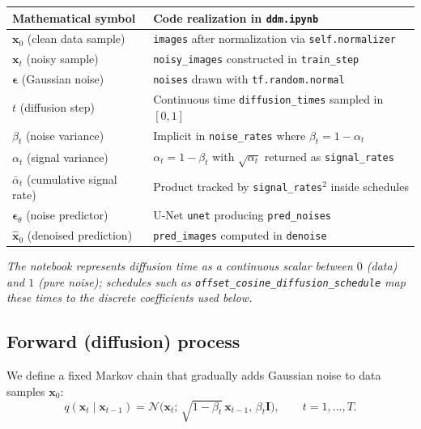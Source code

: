 \documentclass[11pt]{article}
\theoremstyle{remark}
\begin{document}
\begin{center}
\renewcommand{\arraystretch}{1.2}
\begin{tabularx}{\textwidth}{@{}>{\raggedright\arraybackslash}p{} >{\raggedright\arraybackslash}X@{}}
\toprule
\textbf{Mathematical symbol} & \textbf{Code realization in \texttt{ddm.ipynb}} \\
\midrule
$\mathbf{x}_0$ (clean data sample) & \texttt{images} after normalization via \texttt{self.normalizer} \\
$\mathbf{x}_t$ (noisy sample) & \texttt{noisy\_images} constructed in \texttt{train\_step} \\
$\boldsymbol{\epsilon}$ (Gaussian noise) & \texttt{noises} drawn with \texttt{tf.random.normal} \\
$t$ (diffusion step) & Continuous time \texttt{diffusion\_times} sampled in $[0,1]$ \\
$\beta_t$ (noise variance) & Implicit in \texttt{noise\_rates} where $\beta_t = 1 - \alpha_t$ \\
$\alpha_t$ (signal variance) & $\alpha_t = 1 - \beta_t$ with $\sqrt{\alpha_t}$ returned as \texttt{signal\_rates} \\
$\bar{\alpha}_t$ (cumulative signal rate) & Product tracked by \texttt{signal\_rates}$^2$ inside schedules \\
$\boldsymbol{\epsilon}_\theta$ (noise predictor) & U\!-Net \texttt{unet} producing \texttt{pred\_noises} \\
$\hat{\mathbf{x}}_0$ (denoised prediction) & \texttt{pred\_images} computed in \texttt{denoise} \\
\bottomrule
\end{tabularx}
\end{center}

\textit{The notebook represents diffusion time as a continuous scalar between $0$ (data) and $1$ (pure noise); schedules such as \texttt{offset\_cosine\_diffusion\_schedule} map these times to the discrete coefficients used below.}

\subsection{Forward (diffusion) process}

We define a fixed Markov chain that gradually adds Gaussian noise to data samples $\mathbf{x}_0$:
\begin{equation}
q(\mathbf{x}_t \mid \mathbf{x}_{t-1}) = \mathcal{N}\!\Big(\mathbf{x}_t;\, \sqrt{1-\beta_t}\,\mathbf{x}_{t-1},\, \beta_t \mathbf{I}\Big), \qquad t = 1, \dots, T.
\label{eq:forward-step}
\end{equation}
\end{document}

